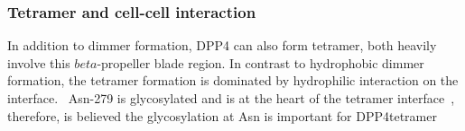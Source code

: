 \subsubsection{Tetramer and cell-cell interaction}

In addition to dimmer formation, DPP4 can also form tetramer, both heavily involve this $beta$-propeller blade region. In contrast to hydrophobic dimmer formation, the tetramer formation is dominated by hydrophilic interaction on the interface.~\cite{Engel_2003} Asn-279 is glycosylated and is at the heart of the tetramer interface~\cite{Engel_2003}, therefore, is believed the glycosylation at Asn is important for DPP4tetramer 
